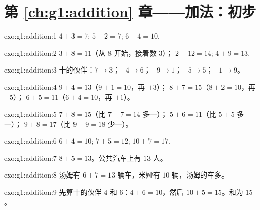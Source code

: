 \section*{第 \ref{ch:g1:addition} 章——加法：初步}

\begin{solution}{exo:g1:addition:1}
$4 + 3 = 7$; \quad $5 + 2 = 7$; \quad $6 + 4 = 10$.
\end{solution}

\begin{solution}{exo:g1:addition:2}
$3 + 8 = 11$（从 $8$ 开始，接着数 $3$）；\quad
$2 + 12 = 14$; \quad $4 + 9 = 13$.
\end{solution}

\begin{solution}{exo:g1:addition:3}
十的伙伴：$7 \to 3$； \ $4 \to 6$； \ $9 \to 1$； \ $5 \to 5$；
\ $1 \to 9$。
\end{solution}

\begin{solution}{exo:g1:addition:4}
$9 + 4 = 13$（$9 + 1 = 10$，再 $+3$）；\quad
$8 + 7 = 15$（$8 + 2 = 10$，再 $+5$）；\quad
$6 + 5 = 11$（$6 + 4 = 10$，再 $+1$）。
\end{solution}

\begin{solution}{exo:g1:addition:5}
$7 + 8 = 15$（比 $7 + 7 = 14$ 多一）；\quad
$5 + 6 = 11$（比 $5 + 5$ 多一）；\quad
$9 + 8 = 17$（比 $9 + 9 = 18$ 少一）。
\end{solution}

\begin{solution}{exo:g1:addition:6}
$6 + 4 = 10$; \quad $7 + 5 = 12$; \quad $10 + 7 = 17$.
\end{solution}

\begin{solution}{exo:g1:addition:7}
$8 + 5 = 13$。公共汽车上有 $13$ 人。
\end{solution}

\begin{solution}{exo:g1:addition:8}
汤姆有 $6 + 7 = 13$ 辆车，米娅有 $10$ 辆，汤姆的车多。
\end{solution}

\begin{solution}{exo:g1:addition:9}
先算十的伙伴 $4$ 和 $6$：$4 + 6 = 10$，然后
$10 + 5 = 15$。和为 $15$。
\end{solution}
